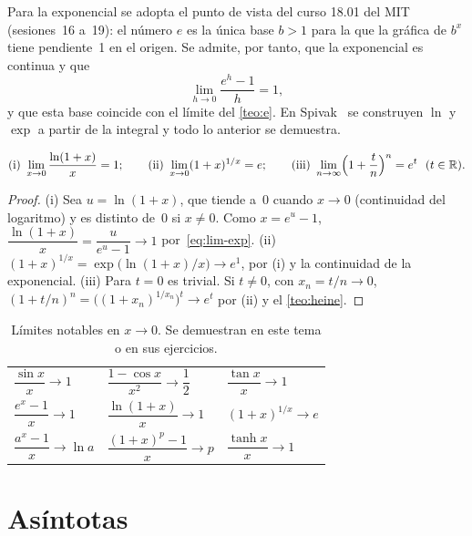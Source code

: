 Para la exponencial se adopta el punto de vista del curso 18.01 del MIT~\cite{mit1801} (sesiones~16 a~19): el número $e$ es la única base $b>1$ para la que la gráfica de $b^{x}$ tiene pendiente~1 en el origen. Se admite, por tanto, que la exponencial es continua y que
\begin{equation}\label{eq:lim-exp}
\lim_{h\to0}\frac{e^{h}-1}{h}=1,
\end{equation}
y que esta base coincide con el límite del \cref{teo:e}. En Spivak~\cite[cap.~18]{spivak} se construyen $\ln$ y $\exp$ a partir de la integral y todo lo anterior se demuestra.

\begin{proposicion}\label{prop:notables-exp}
\[
\text{(i)}\ \lim_{x\to0}\frac{\ln(1+x)}{x}=1;\qquad
\text{(ii)}\ \lim_{x\to0}(1+x)^{1/x}=e;\qquad
\text{(iii)}\ \lim_{n\to\infty}\Bigl(1+\frac{t}{n}\Bigr)^{n}=e^{t}\ \ (t\in\R).
\]
\end{proposicion}

\begin{proof}
(i) Sea $u=\ln(1+x)$, que tiende a~0 cuando $x\to0$ (continuidad del logaritmo) y es distinto de~0 si $x\ne0$. Como $x=e^{u}-1$, $\dfrac{\ln(1+x)}{x}=\dfrac{u}{e^{u}-1}\to1$ por~\eqref{eq:lim-exp}. (ii) $(1+x)^{1/x}=\exp\bigl(\ln(1+x)/x\bigr)\to e^{1}$, por (i) y la continuidad de la exponencial. (iii) Para $t=0$ es trivial. Si $t\ne0$, con $x_n=t/n\to0$, $(1+t/n)^{n}=\bigl((1+x_n)^{1/x_n}\bigr)^{t}\to e^{t}$ por (ii) y el \cref{teo:heine}.
\end{proof}

\begin{table}[h]
\centering\small
\caption{Límites notables en $x\to0$. Se demuestran en este tema o en sus ejercicios.}\label{tab:notables}
\begin{tabular}{@{}lll@{}}
\toprule
$\dfrac{\sin x}{x}\to1$ & $\dfrac{1-\cos x}{x^{2}}\to\dfrac12$ & $\dfrac{\tan x}{x}\to1$ \\[2mm]
$\dfrac{e^{x}-1}{x}\to1$ & $\dfrac{\ln(1+x)}{x}\to1$ & $(1+x)^{1/x}\to e$ \\[2mm]
$\dfrac{a^{x}-1}{x}\to\ln a$ & $\dfrac{(1+x)^{p}-1}{x}\to p$ & $\dfrac{\tanh x}{x}\to1$ \\
\bottomrule
\end{tabular}
\end{table}

\section{Asíntotas}

